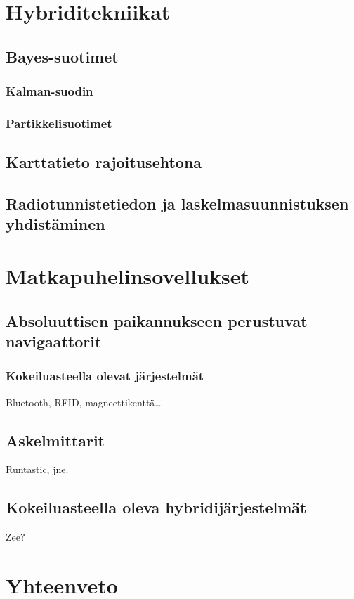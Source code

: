 \documentclass[a4paper]{scrartcl}
\begin{document}
\section{Hybriditekniikat}
\cite{woodman2010pedestrian}
\cite{evennou2006advanced}
\cite{leppakoski2013pedestrian}
\subsection{Bayes-suotimet}
\subsubsection{Kalman-suodin}
\subsubsection{Partikkelisuotimet}
\subsection{Karttatieto rajoitusehtona}
\cite{li2012reliable}
\subsection{Radiotunnistetiedon ja laskelmasuunnistuksen yhdistäminen}
\cite{rai2012zee}

\section{Matkapuhelinsovellukset}
\subsection{Absoluuttisen paikannukseen perustuvat navigaattorit}
\subsubsection{Kokeiluasteella olevat järjestelmät}
Bluetooth, RFID, magneettikenttä\ldots
\subsection{Askelmittarit}
Runtastic, jne.
\subsection{Kokeiluasteella oleva hybridijärjestelmät}
Zee?

\section{Yhteenveto}
\end{document}
